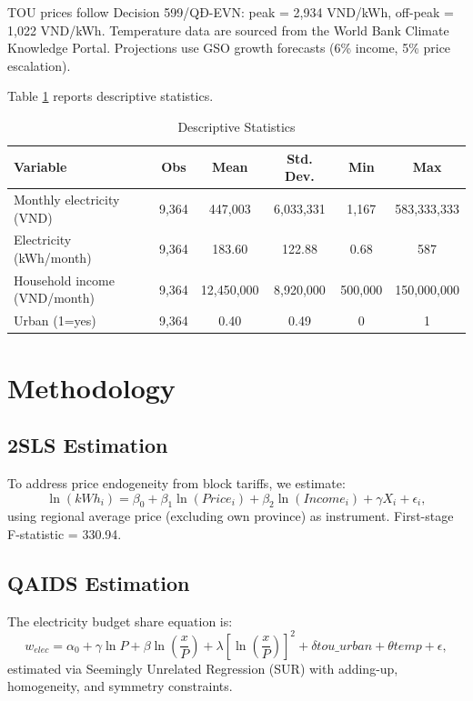 \documentclass[12pt,a4paper]{article}
\begin{document}
	TOU prices follow Decision 599/QĐ-EVN: peak = 2,934 VND/kWh, off-peak = 1,022 VND/kWh. Temperature data are sourced from the World Bank Climate Knowledge Portal. Projections use GSO growth forecasts (6\% income, 5\% price escalation).
	
	Table \ref{tab:descriptive} reports descriptive statistics.
	
	\begin{table}[htbp]
		\caption{Descriptive Statistics}
		\label{tab:descriptive}
		\centering
		\begin{tabular}{lccccc}
			\toprule
			Variable & Obs & Mean & Std. Dev. & Min & Max \\
			\midrule
			Monthly electricity (VND) & 9,364 & 447,003 & 6,033,331 & 1,167 & 583,333,333 \\
			Electricity (kWh/month) & 9,364 & 183.60 & 122.88 & 0.68 & 587 \\
			Household income (VND/month) & 9,364 & 12,450,000 & 8,920,000 & 500,000 & 150,000,000 \\
			Urban (1=yes) & 9,364 & 0.40 & 0.49 & 0 & 1 \\
			\bottomrule
		\end{tabular}
	\end{table}
	
	\section{Methodology}
	
	\subsection{2SLS Estimation}
	To address price endogeneity from block tariffs, we estimate:
	\[
	\ln(kWh_i) = \beta_0 + \beta_1 \ln(Price_i) + \beta_2 \ln(Income_i) + \gamma X_i + \epsilon_i,
	\]
	using regional average price (excluding own province) as instrument. First-stage F-statistic = 330.94.
	
	\subsection{QAIDS Estimation}
	The electricity budget share equation is:
	\[
	w_{elec} = \alpha_0 + \gamma \ln P + \beta \ln\left(\frac{x}{P}\right) + \lambda \left[\ln\left(\frac{x}{P}\right)\right]^2 + \delta tou\_urban + \theta temp + \epsilon,
	\]
	estimated via Seemingly Unrelated Regression (SUR) with adding-up, homogeneity, and symmetry constraints.
	
\end{document}
